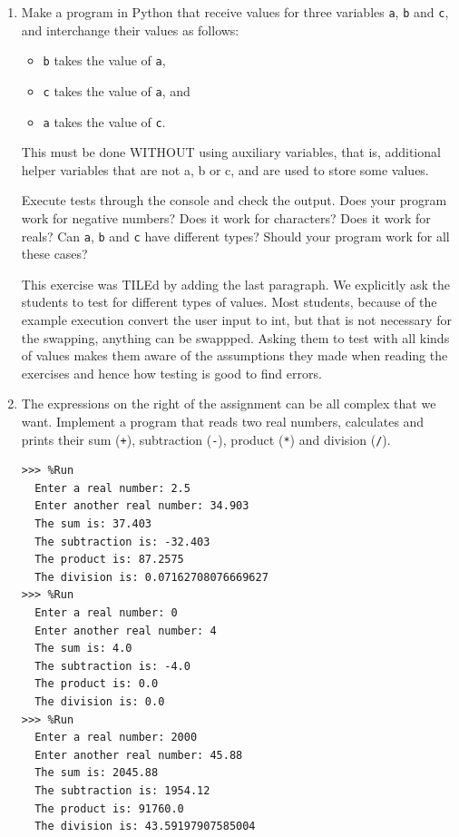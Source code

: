 \documentclass[
  fontsize=10pt,
  a4paper,
]{scrartcl}
\newenvironment{howTILEd}%
  {\begin{mdframed}[skipabove=10pt,skipbelow=10pt,backgroundcolor=pink!40]}%
  {\end{mdframed}}
\begin{document}
\begin{enumerate}
\item Make a program in Python that receive values for three variables
\verb+a+, \verb+b+ and \verb+c+, and interchange their values as follows:
\begin{itemize}
\item \verb+b+ takes the value of \verb+a+, 
\item \verb+c+ takes the value of \verb+a+, and
\item \verb+a+ takes the value of \verb+c+.
\end{itemize}
This must be done WITHOUT using
auxiliary variables, that is, additional helper variables that are not a, b or c, and are used to store some values.

Execute tests through the console and check the output. Does your program work for negative numbers? Does it work for characters? Does it work for reals? Can \verb+a+, \verb+b+ and \verb+c+ have different types? Should your program work for all these cases?


\begin{howTILEd}
This exercise was TILEd by adding the last paragraph. We explicitly ask the students to test for different types of values. Most students, because of the example execution convert the user input to int, but that is not necessary for the swapping, anything can be swappped. Asking them to test with all kinds of values makes them aware of the assumptions they made when reading the exercises and hence how testing is good to find errors.
\end{howTILEd}


\item The expressions on the right of the assignment can be all complex that we want. Implement a program that reads two real numbers, calculates and prints their sum ({\tt +}), subtraction ({\tt -}), product (\verb+*+) and
division (\verb+/+). 

\begin{Verbatim}[frame=single, label={\em example test execution of the program}]
>>> %Run 
  Enter a real number: 2.5
  Enter another real number: 34.903
  The sum is: 37.403
  The subtraction is: -32.403
  The product is: 87.2575
  The division is: 0.07162708076669627
>>> %Run 
  Enter a real number: 0
  Enter another real number: 4
  The sum is: 4.0
  The subtraction is: -4.0
  The product is: 0.0
  The division is: 0.0
>>> %Run 
  Enter a real number: 2000
  Enter another real number: 45.88
  The sum is: 2045.88
  The subtraction is: 1954.12
  The product is: 91760.0
  The division is: 43.59197907585004
\end{Verbatim}


\end{enumerate}
\end{document}

